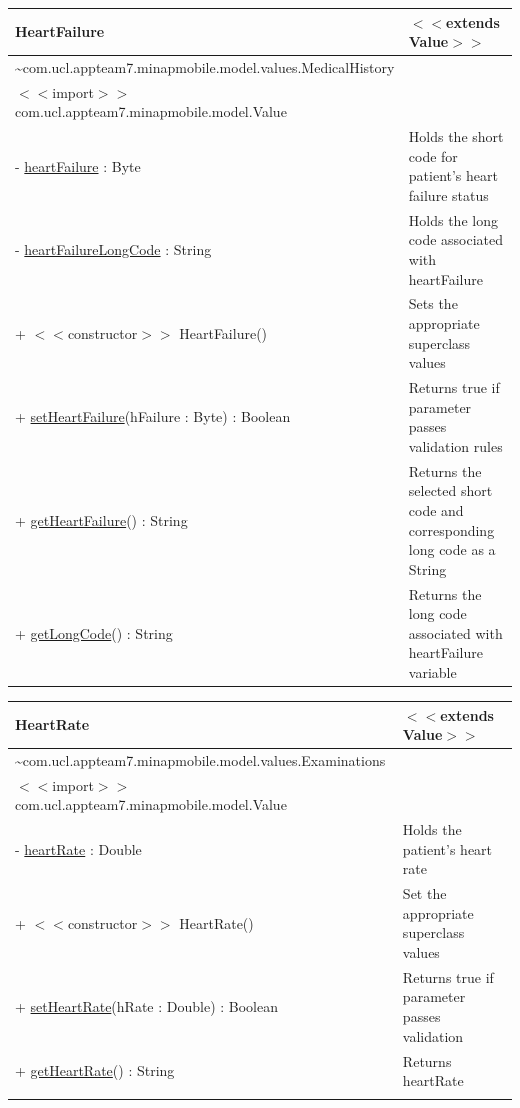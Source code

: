 \documentclass[12pt,a4paper,oneside,titlepage]{article}
\begin{document}
\begin{center}
	\begin{tabular}{| p{13cm} | p{5cm} |}
	\hline
	\textbf{HeartFailure} & \textbf{$<<$extends Value$>>$} \\ \hline
	\textasciitilde com.ucl.appteam7.minapmobile.model.values.MedicalHistory & \\ \hline
	$<<$import$>>$ com.ucl.appteam7.minapmobile.model.Value & \\ \hline \hline
	- \underline{heartFailure} : Byte & Holds the short code for patient's heart failure status \\ \hline
	- \underline{heartFailureLongCode} : String & Holds the long code associated with heartFailure \\ \hline \hline
	+ $<<$constructor$>>$ HeartFailure() & Sets the appropriate superclass values \\ \hline
	+ \underline{setHeartFailure}(hFailure : Byte) : Boolean & Returns true if parameter passes validation rules \\ \hline
	+ \underline{getHeartFailure}() : String & Returns the selected short code and corresponding long code as a String \\ \hline
	+ \underline{getLongCode}() : String & Returns the long code associated with heartFailure variable \\ \hline
	\end{tabular}
\end{center}

\begin{center}
	\begin{tabular}{| p{13cm} | p{5cm} |}
	\hline
	\textbf{HeartRate} & \textbf{$<<$extends Value$>>$} \\ \hline
	\textasciitilde com.ucl.appteam7.minapmobile.model.values.Examinations & \\ \hline
	$<<$import$>>$ com.ucl.appteam7.minapmobile.model.Value & \\ \hline \hline
	- \underline{heartRate} : Double & Holds the patient's heart rate \\ \hline \hline
	+ $<<$constructor$>>$ HeartRate() & Set the appropriate superclass values \\ \hline
	+ \underline{setHeartRate}(hRate : Double) : Boolean & Returns true if parameter passes validation \\ \hline
	+ \underline{getHeartRate}() : String & Returns heartRate \\&\\ \hline
	\end{tabular}
\end{center}
\end{document}
